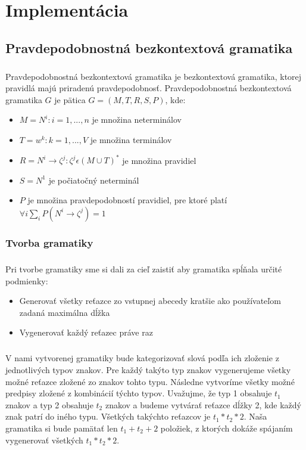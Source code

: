\chapter{Implementácia}

\section{Pravdepodobnostná bezkontextová gramatika}
\paragraph{}
Pravdepodobnostná bezkontextová gramatika je bezkontextová gramatika, ktorej pravidlá majú priradenú pravdepodobnosť. Pravdepodobnostná bezkontextová gramatika \(G\) je pätica \(G = (M, T, R, S, P)\), kde:
\begin{itemize}
	\item \(M = { N^i : i = 1,...,n }\) je množina neterminálov
	\item \(T = { w^k : k = 1,...,V }\) je množina terminálov
	\item \(R = { N^i \to \zeta^j : \zeta^j \epsilon (M \cup T)^* }\) je množina pravidiel
	\item \(S = N^1\) je počiatočný neterminál
	\item \(P\) je množina pravdepodobností pravidiel, pre ktoré platí \( \forall i \displaystyle\sum_{i} P(N^i \to \zeta^j) = 1\)
\end{itemize}

\subsection{Tvorba gramatiky}
\paragraph{}
Pri tvorbe gramatiky sme si dali za cieľ zaistiť aby gramatika spĺňala určité podmienky:
\begin{itemize}
	\item Generovať všetky reťazce zo vstupnej abecedy kratšie ako používateľom zadaná maximálna dĺžka
	\item Vygenerovať každý reťazec práve raz
\end{itemize}

\paragraph{}
V nami vytvorenej gramatiky bude kategorizovať slová podľa ich zloženie z jednotlivých typov znakov. Pre každý takýto typ znakov vygenerujeme všetky možné reťazce zložené zo znakov tohto typu. Následne vytvoríme všetky možné predpisy zložené z kombinácií týchto typov. Uvažujme, že typ 1 obsahuje \(t_1\) znakov a typ 2 obsahuje \(t_2\) znakov a budeme vytvárať reťazce dĺžky 2, kde každý znak patrí do iného typu. Všetkých takýchto reťazcov je \(t_1 * t_2 * 2\). Naša gramatika si bude pamätať len \(t_1 + t_2 + 2\) položiek, z ktorých dokáže spájaním vygenerovať všetkých \(t_1 * t_2 * 2\).

